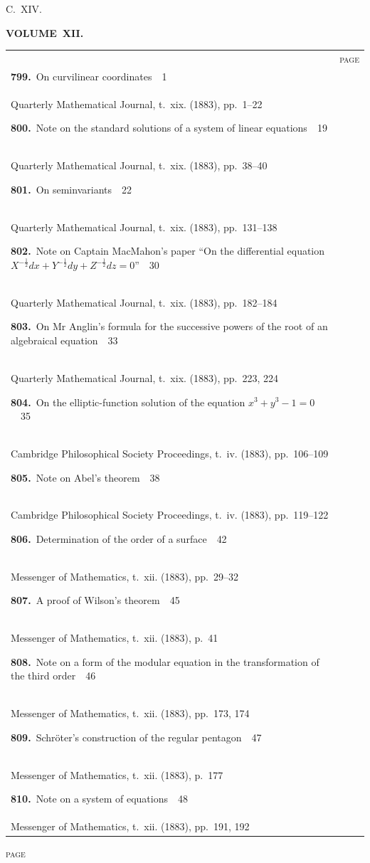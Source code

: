 \documentclass[11pt,a4paper]{book}
\newcommand{\paperentry}[4]{%
  \noindent\textbf{#1.}\ {#2}\ \dotfill\ {#3}\\[-0.2em]%
  {\small #4}\par\vspace{0.6em}%
}
\begin{document}
\newpage
\thispagestyle{empty}
\fancyhead[C]{}
\noindent\hfill{\large C.~XIV.}\hfill\null\vspace{0.5em}

\begin{center}
{\Large\bfseries VOLUME~XII.}
\end{center}
\vspace{0.5em}

\begin{center}
\begin{tabular}{p{4.2in}r}
& \textsc{page} \\
\paperentry{799}{On curvilinear coordinates}{1}{Quarterly Mathematical Journal, t.~xix. (1883), pp.~1--22}
\paperentry{800}{Note on the standard solutions of a system of linear equations}{19}{Quarterly Mathematical Journal, t.~xix. (1883), pp.~38--40}
\paperentry{801}{On seminvariants}{22}{Quarterly Mathematical Journal, t.~xix. (1883), pp.~131--138}
\paperentry{802}{Note on Captain MacMahon's paper ``On the differential equation $X^{-\frac{1}{2}}dx + Y^{-\frac{1}{2}}dy + Z^{-\frac{1}{2}}dz = 0$''}{30}{Quarterly Mathematical Journal, t.~xix. (1883), pp.~182--184}
\paperentry{803}{On Mr Anglin's formula for the successive powers of the root of an algebraical equation}{33}{Quarterly Mathematical Journal, t.~xix. (1883), pp.~223, 224}
\paperentry{804}{On the elliptic-function solution of the equation $x^{3} + y^{3} - 1 = 0$}{35}{Cambridge Philosophical Society Proceedings, t.~iv. (1883), pp.~106--109}
\paperentry{805}{Note on Abel's theorem}{38}{Cambridge Philosophical Society Proceedings, t.~iv. (1883), pp.~119--122}
\paperentry{806}{Determination of the order of a surface}{42}{Messenger of Mathematics, t.~xii. (1883), pp.~29--32}
\paperentry{807}{A proof of Wilson's theorem}{45}{Messenger of Mathematics, t.~xii. (1883), p.~41}
\paperentry{808}{Note on a form of the modular equation in the transformation of the third order}{46}{Messenger of Mathematics, t.~xii. (1883), pp.~173, 174}
\paperentry{809}{Schr\"{o}ter's construction of the regular pentagon}{47}{Messenger of Mathematics, t.~xii. (1883), p.~177}
\paperentry{810}{Note on a system of equations}{48}{Messenger of Mathematics, t.~xii. (1883), pp.~191, 192}
\end{tabular}
\end{center}

\newpage
\thispagestyle{fancy}
\begin{center}
{\small\textsc{page}}
\end{center}
\vspace{-0.5em}
\end{document}
